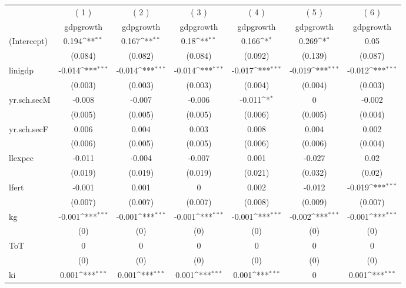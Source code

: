 \def\sym#1{\ifmmode^{#1}\else\(^{#1}\)\fi}
\begin{table}[p]
\centering
\small
\begin{tabular}{l*{6}{c}}
\hline\hline
	 &\multicolumn{1}{c}{( 1 )}  	 &\multicolumn{1}{c}{( 2 )}  	 &\multicolumn{1}{c}{( 3 )}  	 &\multicolumn{1}{c}{( 4 )}  	 &\multicolumn{1}{c}{( 5 )}  	 &\multicolumn{1}{c}{( 6 )}  \\  &\multicolumn{1}{c}{gdpgrowth} &\multicolumn{1}{c}{gdpgrowth} &\multicolumn{1}{c}{gdpgrowth} &\multicolumn{1}{c}{gdpgrowth} &\multicolumn{1}{c}{gdpgrowth} &\multicolumn{1}{c}{gdpgrowth} \\
\hline
(Intercept) 		&0.194\sym{**} 		&0.167\sym{**} 		&0.18\sym{**} 		&0.166\sym{*} 		&0.269\sym{*} 		&0.05 \\
  		&(0.084) 		&(0.082) 		&(0.084) 		&(0.092) 		&(0.139) 		&(0.087) \\
linigdp 		&-0.014\sym{***} 		&-0.014\sym{***} 		&-0.014\sym{***} 		&-0.017\sym{***} 		&-0.019\sym{***} 		&-0.012\sym{***} \\
  		&(0.003) 		&(0.003) 		&(0.003) 		&(0.004) 		&(0.004) 		&(0.003) \\
yr.sch.secM 		&-0.008 		&-0.007 		&-0.006 		&-0.011\sym{*} 		&0 		&-0.002 \\
  		&(0.005) 		&(0.005) 		&(0.005) 		&(0.006) 		&(0.005) 		&(0.004) \\
yr.sch.secF 		&0.006 		&0.004 		&0.003 		&0.008 		&0.004 		&0.002 \\
  		&(0.006) 		&(0.005) 		&(0.005) 		&(0.006) 		&(0.006) 		&(0.004) \\
llexpec 		&-0.011 		&-0.004 		&-0.007 		&0.001 		&-0.027 		&0.02 \\
  		&(0.019) 		&(0.019) 		&(0.019) 		&(0.021) 		&(0.032) 		&(0.02) \\
lfert 		&-0.001 		&0.001 		&0 		&0.002 		&-0.012 		&-0.019\sym{***} \\
  		&(0.007) 		&(0.007) 		&(0.007) 		&(0.008) 		&(0.009) 		&(0.007) \\
kg 		&-0.001\sym{***} 		&-0.001\sym{***} 		&-0.001\sym{***} 		&-0.001\sym{***} 		&-0.002\sym{***} 		&-0.001\sym{***} \\
  		&(0) 		&(0) 		&(0) 		&(0) 		&(0) 		&(0) \\
ToT 		&0 		&0 		&0 		&0 		&0 		&0 \\
  		&(0) 		&(0) 		&(0) 		&(0) 		&(0) 		&(0) \\
ki 		&0.001\sym{***} 		&0.001\sym{***} 		&0.001\sym{***} 		&0.001\sym{***} 		&0 		&0.001\sym{***} \\

\end{tabular}
\end{table}

